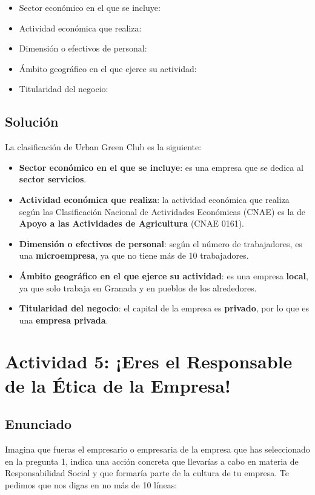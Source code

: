 \begin{itemize}
    \item Sector económico en el que se incluye:
    \item Actividad económica que realiza:
    \item Dimensión o efectivos de personal:
    \item Ámbito geográfico en el que ejerce su actividad:
    \item Titularidad del negocio:
\end{itemize}

\subsection{Solución}
La clasificación de Urban Green Club es la siguiente:

\begin{itemize}
    \item \textbf{Sector económico en el que se incluye}:  es una empresa que se dedica al \textbf{sector servicios}.
    \item \textbf{Actividad económica que realiza}: la actividad económica que realiza según las Clasificación Nacional de Actividades Económicas (CNAE) es la de \textbf{Apoyo a las Actividades de Agricultura} (CNAE 0161).
    \item \textbf{Dimensión o efectivos de personal}: según el número de trabajadores, es una \textbf{microempresa}, ya que no tiene más de 10 trabajadores.
    \item \textbf{Ámbito geográfico en el que ejerce su actividad}: es una empresa \textbf{local}, ya que solo trabaja en Granada y en pueblos de los alrededores.
    \item \textbf{Titularidad del negocio}: el capital de la empresa es \textbf{privado}, por lo que es una \textbf{empresa privada}.
\end{itemize}

\section{Actividad 5: ¡Eres el Responsable de la Ética de la Empresa!}

\subsection{Enunciado}
Imagina que fueras el empresario o empresaria de la empresa que has seleccionado en la pregunta 1, indica una acción concreta que llevarías a cabo en materia de Responsabilidad Social y que formaría parte de la cultura de tu empresa. Te pedimos que nos digas en no más de 10 líneas:

